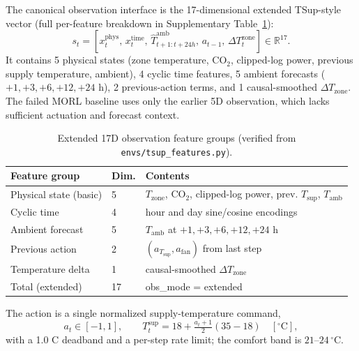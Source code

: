 \documentclass[11pt,a4paper]{article}
\begin{document}
The canonical observation interface is the 17-dimensional extended TSup-style vector (full per-feature breakdown in Supplementary Table~\ref{tab:obs17}):
\begin{equation}
  s_t =
  \left[
  x^{\mathrm{phys}}_t,\,
  x^{\mathrm{time}}_t,\,
  \widehat{T}^{\mathrm{amb}}_{t+1:t+24h},\,
  a_{t-1},\,
  \Delta T^{\mathrm{zone}}_t
  \right] \in \mathbb{R}^{17}.
  \label{eq:obs17}
\end{equation}
It contains 5 physical states (zone temperature, CO$_2$, clipped-log power, previous supply temperature, ambient), 4 cyclic time features, 5 ambient forecasts ($+1,+3,+6,+12,+24$ h), 2 previous-action terms, and 1 causal-smoothed $\Delta T_{\mathrm{zone}}$. The failed MORL baseline uses only the earlier 5D observation, which lacks sufficient actuation and forecast context.

\begin{table}[H]
\centering
\caption{Extended 17D observation feature groups (verified from \texttt{envs/tsup\_features.py}).}
\label{tab:obs17}
\small
\begin{tabularx}{\linewidth}{llX}
\toprule
Feature group & Dim. & Contents \\
\midrule
Physical state (basic) & 5 & $T_{\mathrm{zone}}$, CO$_2$, clipped-log power, prev. $T_{\mathrm{sup}}$, $T_{\mathrm{amb}}$ \\
Cyclic time & 4 & hour and day sine/cosine encodings \\
Ambient forecast & 5 & $T_{\mathrm{amb}}$ at $+1,+3,+6,+12,+24$ h \\
Previous action & 2 & $(a_{T_{\mathrm{sup}}}, a_{\mathrm{fan}})$ from last step \\
Temperature delta & 1 & causal-smoothed $\Delta T_{\mathrm{zone}}$ \\
Total (extended) & 17 & obs\_mode = extended \\
\bottomrule
\end{tabularx}
\end{table}

The action is a single normalized supply-temperature command,
\begin{equation}
  a_t \in [-1,1],
  \qquad
  T^{\mathrm{sup}}_t = 18 + \tfrac{a_t+1}{2}(35-18)\quad [^\circ\mathrm{C}],
  \label{eq:action_map}
\end{equation}
with a 1.0 C deadband and a per-step rate limit; the comfort band is $21$--$24\,^\circ$C.
\end{document}
